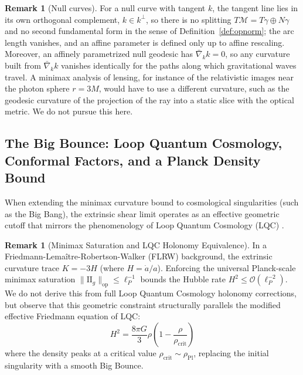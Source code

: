 \documentclass[11pt,reqno]{amsart}
\theoremstyle{definition}
\newtheorem{remark}[theorem]{Remark}
\providecommand{\II}{\mathrm{I\!I}}
\numberwithin{equation}{section}
\providecommand{\II}{\mathrm{II}}
\begin{document}
\begin{remark}[Null curves]
\label{thm:gw_lensing}
For a null curve with tangent $k$, the tangent line lies in its own orthogonal complement, $k \in k^\perp$, so there is no splitting $T\mathcal{M} = T\gamma \oplus N\gamma$ and no second fundamental form in the sense of Definition~\ref{def:opnorm}; the arc length vanishes, and an affine parameter is defined only up to affine rescaling. Moreover, an affinely parametrized null geodesic has $\bar\nabla_k k = 0$, so any curvature built from $\bar\nabla_k k$ vanishes identically for the paths along which gravitational waves travel. A minimax analysis of lensing, for instance of the relativistic images near the photon sphere $r = 3M$, would have to use a different curvature, such as the geodesic curvature of the projection of the ray into a static slice with the optical metric. We do not pursue this here.
\end{remark}

\subsection{The Big Bounce: Loop Quantum Cosmology, Conformal Factors, and a Planck Density Bound}

When extending the minimax curvature bound to cosmological singularities (such as the Big Bang), the extrinsic shear limit operates as an effective geometric cutoff that mirrors the phenomenology of Loop Quantum Cosmology (LQC) \cite{ashtekar2006quantum}.

\begin{remark}[Minimax Saturation and LQC Holonomy Equivalence]
In a Friedmann-Lema\^{i}tre-Robertson-Walker (FLRW) background, the extrinsic curvature trace $K = -3H$ (where $H = \dot{a}/a$). Enforcing the universal Planck-scale minimax saturation $\|\II_g\|_{\mathrm{op}} \le \ell_P^{-1}$ bounds the Hubble rate $H^2 \le \mathcal{O}(\ell_P^{-2})$. We do not derive this from full Loop Quantum Cosmology holonomy corrections, but observe that this geometric constraint structurally parallels the modified effective Friedmann equation of LQC:
\begin{equation}
H^2 = \frac{8\pi G}{3} \rho \left(1 - \frac{\rho}{\rho_{\mathrm{crit}}}\right)
\end{equation}
where the density peaks at a critical value $\rho_{\mathrm{crit}} \sim \rho_{\mathrm{Pl}}$, replacing the initial singularity with a smooth Big Bounce.
\end{remark}
\end{document}
